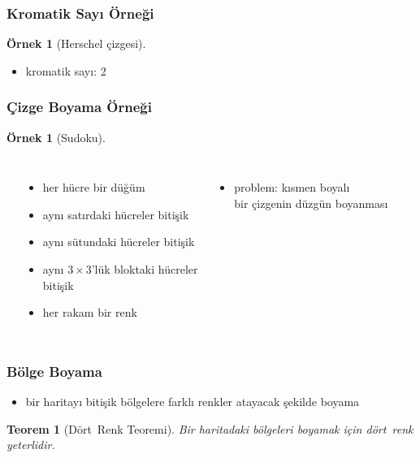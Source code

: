 \documentclass[dvipsnames]{beamer}
\theoremstyle{definition}
\theoremstyle{example}
\newtheorem{ornek}[theorem]{Örnek}
\theoremstyle{plain}
\newtheorem{teorem}[theorem]{Teorem}
\begin{document}
\begin{frame}
  \frametitle{Kromatik Sayı Örneği}

  \begin{ornek}[Herschel çizgesi]
    \begin{center}
    \end{center}

    \begin{itemize}
      \item kromatik sayı: 2
    \end{itemize}
  \end{ornek}
\end{frame}

\begin{frame}
  \frametitle{Çizge Boyama Örneği}

  \begin{ornek}[Sudoku]
    \begin{columns}[t]
      \begin{center}
      \end{center}

      \begin{itemize}
        \item her hücre bir düğüm
        \item aynı satırdaki hücreler bitişik
        \item aynı sütundaki hücreler bitişik
        \item aynı $3 \times 3$'lük bloktaki hücreler\\
          bitişik
        \item her rakam bir renk
      \end{itemize}

      \pause
      \begin{itemize}
        \item problem: kısmen boyalı\\
          bir çizgenin düzgün boyanması
      \end{itemize}
    \end{columns}
  \end{ornek}
\end{frame}

\begin{frame}
  \frametitle{Bölge Boyama}

  \begin{itemize}
    \item bir haritayı bitişik bölgelere farklı renkler atayacak şekilde boyama
  \end{itemize}

  \medskip
  \begin{teorem}[Dört~Renk Teoremi]
    Bir haritadaki bölgeleri boyamak için dört~renk yeterlidir.
  \end{teorem}
\end{frame}
\end{document}
